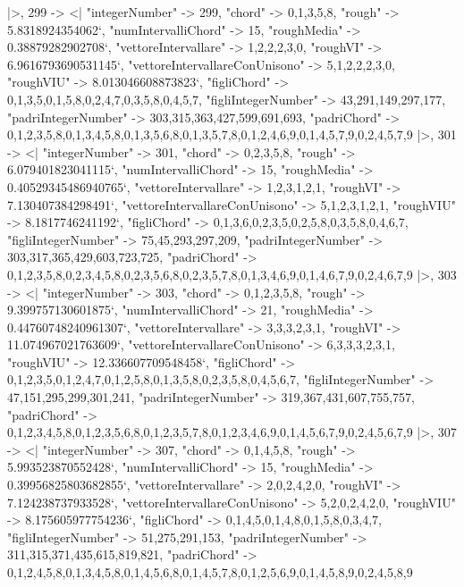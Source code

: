 \documentclass[
]{article}
\begin{document}
\begin{DatasetVerbatim}
  |>,
  299 -> <|
    "integerNumber" -> 299,
    "chord" -> {0,1,3,5,8},
    "rough" -> 5.8318924354062`,
    "numIntervalliChord" -> 15,
    "roughMedia" -> 0.38879282902708`,
    "vettoreIntervallare" -> {1,2,2,2,3,0},
    "roughVI" -> 6.9616793690531145`,
    "vettoreIntervallareConUnisono" -> {5,1,2,2,2,3,0},
    "roughVIU" -> 8.013046608873823`,
    "figliChord" -> {{0,1,3,5},{0,1,5,8},{0,2,4,7},{0,3,5,8},{0,4,5,7}},
    "figliIntegerNumber" -> {43,291,149,297,177},
    "padriIntegerNumber" -> {303,315,363,427,599,691,693},
    "padriChord" -> {{0,1,2,3,5,8},{0,1,3,4,5,8},{0,1,3,5,6,8},{0,1,3,5,7,8},{0,1,2,4,6,9},{0,1,4,5,7,9},{0,2,4,5,7,9}}
  |>,
  301 -> <|
    "integerNumber" -> 301,
    "chord" -> {0,2,3,5,8},
    "rough" -> 6.079401823041115`,
    "numIntervalliChord" -> 15,
    "roughMedia" -> 0.40529345486940765`,
    "vettoreIntervallare" -> {1,2,3,1,2,1},
    "roughVI" -> 7.130407384298491`,
    "vettoreIntervallareConUnisono" -> {5,1,2,3,1,2,1},
    "roughVIU" -> 8.1817746241192`,
    "figliChord" -> {{0,1,3,6},{0,2,3,5},{0,2,5,8},{0,3,5,8},{0,4,6,7}},
    "figliIntegerNumber" -> {75,45,293,297,209},
    "padriIntegerNumber" -> {303,317,365,429,603,723,725},
    "padriChord" -> {{0,1,2,3,5,8},{0,2,3,4,5,8},{0,2,3,5,6,8},{0,2,3,5,7,8},{0,1,3,4,6,9},{0,1,4,6,7,9},{0,2,4,6,7,9}}
  |>,
  303 -> <|
    "integerNumber" -> 303,
    "chord" -> {0,1,2,3,5,8},
    "rough" -> 9.399757130601875`,
    "numIntervalliChord" -> 21,
    "roughMedia" -> 0.44760748240961307`,
    "vettoreIntervallare" -> {3,3,3,2,3,1},
    "roughVI" -> 11.074967021763609`,
    "vettoreIntervallareConUnisono" -> {6,3,3,3,2,3,1},
    "roughVIU" -> 12.336607709548458`,
    "figliChord" -> {{0,1,2,3,5},{0,1,2,4,7},{0,1,2,5,8},{0,1,3,5,8},{0,2,3,5,8},{0,4,5,6,7}},
    "figliIntegerNumber" -> {47,151,295,299,301,241},
    "padriIntegerNumber" -> {319,367,431,607,755,757},
    "padriChord" -> {{0,1,2,3,4,5,8},{0,1,2,3,5,6,8},{0,1,2,3,5,7,8},{0,1,2,3,4,6,9},{0,1,4,5,6,7,9},{0,2,4,5,6,7,9}}
  |>,
  307 -> <|
    "integerNumber" -> 307,
    "chord" -> {0,1,4,5,8},
    "rough" -> 5.993523870552428`,
    "numIntervalliChord" -> 15,
    "roughMedia" -> 0.39956825803682855`,
    "vettoreIntervallare" -> {2,0,2,4,2,0},
    "roughVI" -> 7.124238737933528`,
    "vettoreIntervallareConUnisono" -> {5,2,0,2,4,2,0},
    "roughVIU" -> 8.175605977754236`,
    "figliChord" -> {{0,1,4,5},{0,1,4,8},{0,1,5,8},{0,3,4,7}},
    "figliIntegerNumber" -> {51,275,291,153},
    "padriIntegerNumber" -> {311,315,371,435,615,819,821},
    "padriChord" -> {{0,1,2,4,5,8},{0,1,3,4,5,8},{0,1,4,5,6,8},{0,1,4,5,7,8},{0,1,2,5,6,9},{0,1,4,5,8,9},{0,2,4,5,8,9}}

\end{DatasetVerbatim}
\end{document}
